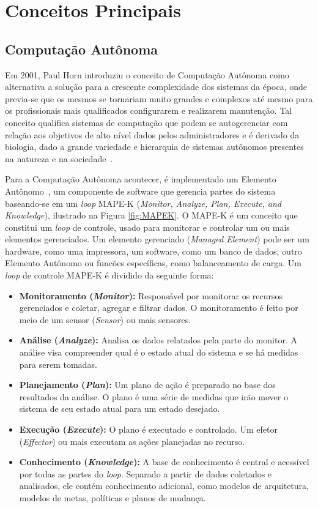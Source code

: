 \documentclass[twocolumn]{article}
\begin{document}
\section{Conceitos Principais}

\subsection{Computação Autônoma}

Em 2001, Paul Horn introduziu o conceito de Computação Autônoma como alternativa a solução para a crescente complexidade dos sistemas da época, onde previa-se que os mesmos se tornariam muito grandes e complexos até mesmo para os profissionais mais qualificados configurarem e realizarem manutenção. Tal conceito qualifica sistemas de computação que podem se autogerenciar com relação aos objetivos de alto nível dados pelos administradores e é derivado da biologia, dado a grande variedade e hierarquia de sistemas autônomos presentes na natureza e na sociedade~\citep{Kephart_2003}.

Para a Computação Autônoma acontecer, é implementado um Elemento Autônomo~\citep{Abbas_2010}, um componente de software que gerencia partes do sistema baseando-se em um \textit{loop} MAPE-K (\textit{Monitor, Analyze, Plan, Execute, and Knowledge}), ilustrado na Figura \ref{fig:MAPEK}. O MAPE-K é um conceito que constitui um \textit{loop} de controle, usado para monitorar e controlar um ou mais elementos gerenciados. Um elemento gerenciado (\textit{Managed Element}) pode ser um hardware, como uma impressora, um software, como um banco de dados, outro Elemento Autônomo ou funcões específicas, como balanceamento de carga. Um \textit{loop} de controle MAPE-K é dividido da seguinte forma:

\begin{itemize}
\item \textbf{Monitoramento (\textit{Monitor}):} Responsável por monitorar os recursos gerenciados e coletar, agregar e filtrar dados. O monitoramento é feito por meio de um sensor (\textit{Sensor}) ou mais sensores.
\item \textbf{Análise (\textit{Analyze}):} Analisa os dados relatados pela parte do monitor. A análise visa compreender qual é o estado atual do sistema e se há medidas para serem tomadas.
\item \textbf{Planejamento (\textit{Plan}):} Um plano de ação é preparado no
base dos resultados da análise. O plano é uma série de medidas que irão mover o sistema de seu estado atual para um estado desejado.
\item \textbf{Execução (\textit{Execute}):} O plano é executado e controlado.
Um efetor (\textit{Effector}) ou mais executam as ações planejadas no recurso.
\item \textbf{Conhecimento (\textit{Knowledge}):} A base de conhecimento é central e acessível por todas as partes do \textit{loop}. Separado a partir de dados coletados e analisados, ele contém conhecimento adicional, como modelos de arquitetura, modelos de metas, políticas e planos de mudança.
\end{itemize}
\end{document}
